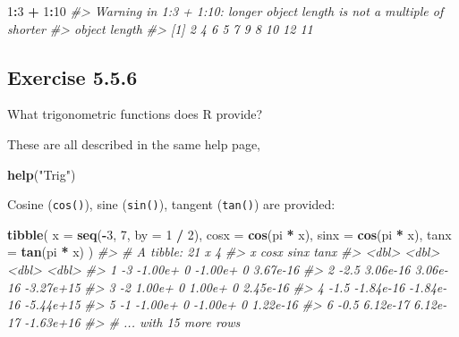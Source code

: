 \documentclass[]{book}
\newenvironment{Shaded}{\begin{snugshade}}{\end{snugshade}}
\newcommand{\CommentTok}[1]{\textcolor[rgb]{0.56,0.35,0.01}{\textit{#1}}}
\newcommand{\DataTypeTok}[1]{\textcolor[rgb]{0.13,0.29,0.53}{#1}}
\newcommand{\DecValTok}[1]{\textcolor[rgb]{0.00,0.00,0.81}{#1}}
\newcommand{\KeywordTok}[1]{\textcolor[rgb]{0.13,0.29,0.53}{\textbf{#1}}}
\newcommand{\NormalTok}[1]{#1}
\newcommand{\OperatorTok}[1]{\textcolor[rgb]{0.81,0.36,0.00}{\textbf{#1}}}
\newcommand{\StringTok}[1]{\textcolor[rgb]{0.31,0.60,0.02}{#1}}
\theoremstyle{plain}
\theoremstyle{remark}
\theoremstyle{definition}
\theoremstyle{definition}
\theoremstyle{definition}
\theoremstyle{remark}
\begin{document}
\begin{Shaded}
\begin{Highlighting}[]
\DecValTok{1}\OperatorTok{:}\DecValTok{3} \OperatorTok{+}\StringTok{ }\DecValTok{1}\OperatorTok{:}\DecValTok{10}
\CommentTok{#> Warning in 1:3 + 1:10: longer object length is not a multiple of shorter}
\CommentTok{#> object length}
\CommentTok{#>  [1]  2  4  6  5  7  9  8 10 12 11}
\end{Highlighting}
\end{Shaded}

\hypertarget{exercise-5.5.6}{%
\subsection*{\texorpdfstring{Exercise
{5.5.6}}{Exercise 5.5.6}}\label{exercise-5.5.6}}

What trigonometric functions does R provide?

These are all described in the same help page,

\begin{Shaded}
\begin{Highlighting}[]
\KeywordTok{help}\NormalTok{(}\StringTok{"Trig"}\NormalTok{)}
\end{Highlighting}
\end{Shaded}

Cosine (\texttt{cos()}), sine (\texttt{sin()}), tangent (\texttt{tan()})
are provided:

\begin{Shaded}
\begin{Highlighting}[]
\KeywordTok{tibble}\NormalTok{(}
  \DataTypeTok{x =} \KeywordTok{seq}\NormalTok{(}\OperatorTok{-}\DecValTok{3}\NormalTok{, }\DecValTok{7}\NormalTok{, }\DataTypeTok{by =} \DecValTok{1} \OperatorTok{/}\StringTok{ }\DecValTok{2}\NormalTok{),}
  \DataTypeTok{cosx =} \KeywordTok{cos}\NormalTok{(pi }\OperatorTok{*}\StringTok{ }\NormalTok{x),}
  \DataTypeTok{sinx =} \KeywordTok{cos}\NormalTok{(pi }\OperatorTok{*}\StringTok{ }\NormalTok{x),}
  \DataTypeTok{tanx =} \KeywordTok{tan}\NormalTok{(pi }\OperatorTok{*}\StringTok{ }\NormalTok{x)}
\NormalTok{)}
\CommentTok{#> # A tibble: 21 x 4}
\CommentTok{#>       x      cosx      sinx      tanx}
\CommentTok{#>   <dbl>     <dbl>     <dbl>     <dbl>}
\CommentTok{#> 1  -3   -1.00e+ 0 -1.00e+ 0  3.67e-16}
\CommentTok{#> 2  -2.5  3.06e-16  3.06e-16 -3.27e+15}
\CommentTok{#> 3  -2    1.00e+ 0  1.00e+ 0  2.45e-16}
\CommentTok{#> 4  -1.5 -1.84e-16 -1.84e-16 -5.44e+15}
\CommentTok{#> 5  -1   -1.00e+ 0 -1.00e+ 0  1.22e-16}
\CommentTok{#> 6  -0.5  6.12e-17  6.12e-17 -1.63e+16}
\CommentTok{#> # ... with 15 more rows}
\end{Highlighting}
\end{Shaded}
\end{document}
